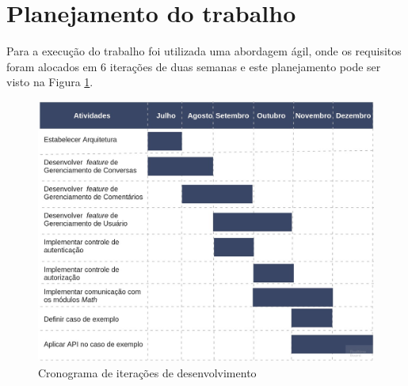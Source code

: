 \section{Planejamento do trabalho}

    Para a execução do trabalho foi utilizada uma abordagem ágil, onde os requisitos foram alocados em 6 iterações de duas semanas e
    este planejamento pode ser visto na Figura \ref{fig:cronograma}.
    
    \begin{figure}[h!]
      \centering
      \includegraphics[scale=0.3]{figuras/cronograma.jpg}
      \caption{Cronograma de iterações de desenvolvimento}
      \label{fig:cronograma}
    \end{figure}